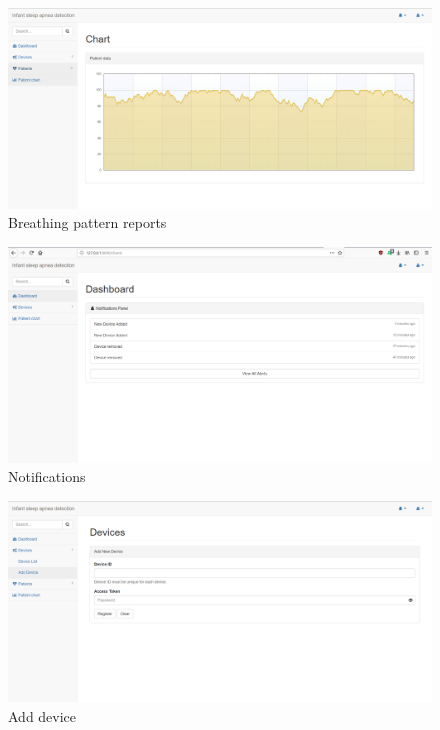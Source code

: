 \documentclass{report}
\begin{document}
\begin{figure}[h]
    \centering
    \includegraphics[scale=0.3]{charts.png}
    \caption{Breathing pattern reports}
    \label{fig:Breating pattern reports}
\end{figure}


\begin{figure}[h]
    \centering
    \includegraphics[scale=0.3]{dashboard.png}
    \caption{Notifications}
    \label{fig:Notifications}
\end{figure}

\begin{figure}[h]
    \centering
    \includegraphics[scale=0.3]{adddevice.png}
    \caption{Add device}
    \label{fig:Add device}
\end{figure}
\end{document}
